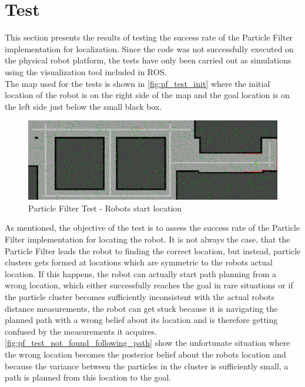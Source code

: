 
\section{Test} %
\label{sec:test}

This section presents the results of testing the success rate of the Particle Filter implementation for localization. Since the code was not successfully executed on the physical robot platform, the tests have only been carried out as simulations using the visualization tool included in ROS.\\

The map used for the tests is shown in \autoref{fig:pf_test_init} where the initial location of the robot is on the right side of the map and the goal location is on the left side just below the small black box.

\begin{figure}[H]
\centering
\includegraphics[scale=0.45]{images/pf_test_init}
\caption{Particle Filter Test - Robots start location}
\label{fig:pf_test_init}
\end{figure}

As mentioned, the objective of the test is to assess the success rate of the Particle Filter implementation for locating the robot. It is not always the case, that the Particle Filter leads the robot to finding the correct location, but instead, particle clusters gets formed at locations which are symmetric to the robots actual location. If this happens, the robot can actually start path planning from a wrong location, which either successfully reaches the goal in rare situations or if the particle cluster becomes sufficiently inconsistent with the actual robots distance measurements, the robot can get stuck because it is navigating the planned path with a wrong belief about its location and is therefore getting confused by the measurements it acquires.\\

\autoref{fig:pf_test_not_found_following_path} show the unfortunate situation where the wrong location becomes the posterior belief about the robots location and because the variance between the particles in the cluster is sufficiently small, a path is planned from this location to the goal.

